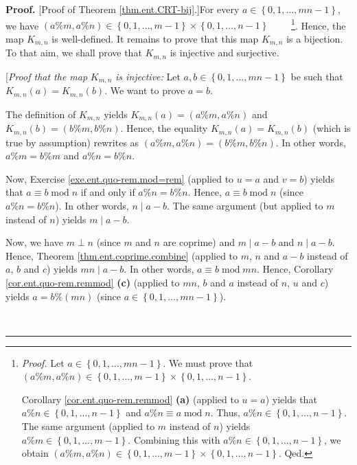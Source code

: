 \documentclass[numbers=enddot,12pt,final,onecolumn,notitlepage]{scrartcl}%
\numberwithin{exer}{subsection}
\theoremstyle{definition}
\newenvironment{proof}[1][Proof]{\noindent\textbf{#1.} }{\ \rule{0.5em}{0.5em}}
\begin{document}
\begin{proof}
[Proof of Theorem \ref{thm.ent.CRT-bij}.]For every $a\in\left\{
0,1,\ldots,mn-1\right\}  $, we have $\left(  a\%m,a\%n\right)  \in\left\{
0,1,\ldots,m-1\right\}  \times\left\{  0,1,\ldots,n-1\right\}  $%
\ \ \ \ \footnote{\textit{Proof.} Let $a\in\left\{  0,1,\ldots,mn-1\right\}
$. We must prove that $\left(  a\%m,a\%n\right)  \in\left\{  0,1,\ldots
,m-1\right\}  \times\left\{  0,1,\ldots,n-1\right\}  $.
\par
Corollary \ref{cor.ent.quo-rem.remmod} \textbf{(a)} (applied to $u=a$) yields
that $a\%n\in\left\{  0,1,\ldots,n-1\right\}  $ and $a\%n\equiv
a\operatorname{mod}n$. Thus, $a\%n\in\left\{  0,1,\ldots,n-1\right\}  $. The
same argument (applied to $m$ instead of $n$) yields $a\%m\in\left\{
0,1,\ldots,m-1\right\}  $. Combining this with $a\%n\in\left\{  0,1,\ldots
,n-1\right\}  $, we obtain $\left(  a\%m,a\%n\right)  \in\left\{
0,1,\ldots,m-1\right\}  \times\left\{  0,1,\ldots,n-1\right\}  $. Qed.}.
Hence, the map $K_{m,n}$ is well-defined. It remains to prove that this map
$K_{m,n}$ is a bijection. To that aim, we shall prove that $K_{m,n}$ is
injective and surjective.

[\textit{Proof that the map }$K_{m,n}$ \textit{is injective:} Let
$a,b\in\left\{  0,1,\ldots,mn-1\right\}  $ be such that $K_{m,n}\left(
a\right)  =K_{m,n}\left(  b\right)  $. We want to prove $a=b$.

The definition of $K_{m,n}$ yields $K_{m,n}\left(  a\right)  =\left(
a\%m,a\%n\right)  $ and $K_{m,n}\left(  b\right)  =\left(  b\%m,b\%n\right)
$. Hence, the equality $K_{m,n}\left(  a\right)  =K_{m,n}\left(  b\right)  $
(which is true by assumption) rewrites as $\left(  a\%m,a\%n\right)  =\left(
b\%m,b\%n\right)  $. In other words, $a\%m=b\%m$ and $a\%n=b\%n$.

Now, Exercise \ref{exe.ent.quo-rem.mod=rem} (applied to $u=a$ and $v=b$)
yields that $a\equiv b\operatorname{mod}n$ if and only if $a\%n=b\%n$. Hence,
$a\equiv b\operatorname{mod}n$ (since $a\%n=b\%n$). In other words, $n\mid
a-b$. The same argument (but applied to $m$ instead of $n$) yields $m\mid a-b$.

Now, we have $m\perp n$ (since $m$ and $n$ are coprime) and $m\mid a-b$ and
$n\mid a-b$. Hence, Theorem \ref{thm.ent.coprime.combine} (applied to $m$, $n$
and $a-b$ instead of $a$, $b$ and $c$) yields $mn\mid a-b$. In other words,
$a\equiv b\operatorname{mod}mn$. Hence, Corollary \ref{cor.ent.quo-rem.remmod}
\textbf{(c)} (applied to $mn$, $b$ and $a$ instead of $n$, $u$ and $c$) yields
$a=b\%\left(  mn\right)  $ (since $a\in\left\{  0,1,\ldots,mn-1\right\}  $).


\end{proof}
\end{document}
